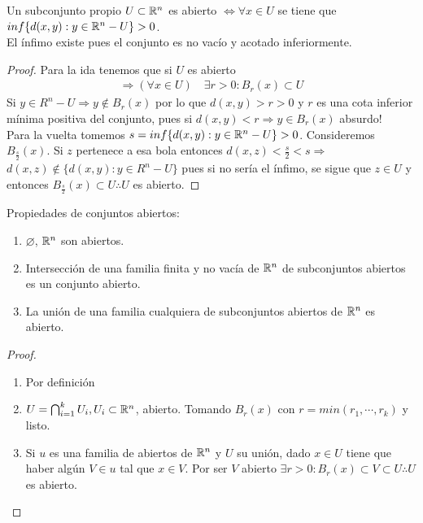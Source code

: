 \begin{prop}
  Un subconjunto propio \(U \subset \mathbb{R}^n\) es abierto \(\iff \forall x \in U\) se tiene que \(inf\{d(x, y) : y \in \mathbb{R}^n - U\} > 0\). \\
  El ínfimo existe pues el conjunto es no vacío y acotado inferiormente.
  \begin{proof}
    Para la ida tenemos que si \(U\) es abierto
    \begin{align*}
      \Rightarrow (\forall x \in U) \quad \exists r > 0 : B_r(x) \subset U
    \end{align*}
    Si \(y \in R^n - U \Rightarrow y \notin B_r(x)\) por lo que \(d(x, y) > r > 0\) y \(r\) es una cota inferior mínima positiva del conjunto, pues si \(d(x,y) < r \Rightarrow y \in B_r(x)\) absurdo! \\

    Para la vuelta tomemos \(s = inf\{ d(x,y) : y \in \mathbb{R}^n - U \} > 0\). Consideremos \(B_{\frac{s}{2}}(x)\). Si \(z\) pertenece a esa bola entonces \(d(x, z) < \frac{s}{2} < s \Rightarrow\) \\
    \(d(x, z) \notin \{ d(x,y) : y \in R^n - U \}\) pues si no sería el ínfimo, se sigue que \(z \in U\) y entonces \(B_{\frac{s}{2}}(x) \subset U \therefore U\) es abierto.
  \end{proof}
\end{prop}

\begin{prop}
  Propiedades de conjuntos abiertos:
  \begin{enumerate}
    \item \(\varnothing\), \(\mathbb{R}^n\) son abiertos.
    \item Intersección de una familia finita y no vacía de \(\mathbb{R}^n\) de subconjuntos abiertos es un conjunto abierto.
    \item La unión de una familia cualquiera de subconjuntos abiertos de \(\mathbb{R}^n\) es abierto.
  \end{enumerate}
  \begin{proof}
    \begin{enumerate}
      \item Por definición
      \item \(U = \bigcap_{i = 1}^k U_i, U_i \subset \mathbb{R}^n\), abierto. Tomando \(B_r(x)\) con \(r = min(r_1, \cdots, r_k)\) y listo.
      \item Si \(u\) es una familia de abiertos de \(\mathbb{R}^n\) y \(U\) su unión, dado \(x \in U\) tiene que haber algún \(V \in u\) tal que \(x \in V\). Por ser \(V\) abierto \(\exists r > 0 : B_r(x) \subset V \subset U \therefore U\) es abierto.
    \end{enumerate}
  \end{proof}
\end{prop}

